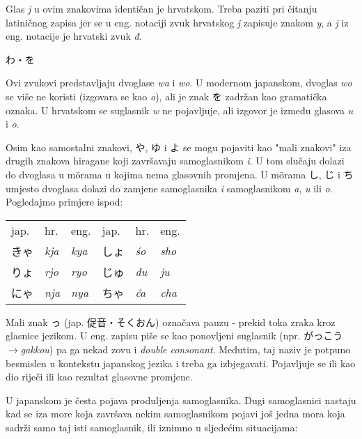 	Glas \textit{j} u ovim znakovima identičan je hrvatskom. Treba paziti pri čitanju latiničnog zapisa jer se u eng. notaciji zvuk hrvatskog \textit{j} zapisuje znakom \textit{y}, a \textit{j} iz eng. notacije je hrvatski zvuk \textit{đ}.
	
	\vspace{5pt}
	\noindent\ten わ・を
	
	Ovi zvukovi predstavljaju dvoglase \textit{wa} i \textit{wo}. U modernom japanskom, dvoglas \textit{wo} se više ne koristi (izgovara se kao \textit{o}), ali je znak を zadržan kao gramatička oznaka. U hrvatskom se suglasnik \textit{w} ne pojavljuje, ali izgovor je između glasova \textit{u} i \textit{o}.
	
	
	Osim kao samostalni znakovi, や, ゆ i よ se mogu pojaviti kao "mali znakovi" iza drugih znakova hiragane koji završavaju samoglasnikom \textit{i}. U tom slučaju dolazi do dvoglasa\footnotemark[3] u m\={o}rama u kojima nema glasovnih promjena. U m\={o}rama し, じ i ち umjesto dvoglasa dolazi do zamjene samoglasnika \textit{i} samoglasnikom \textit{a}, \textit{u} ili \textit{o}. Pogledajmo primjere ispod:
	
	\begin{tabular}{l l l | l l l}
		jap.&hr.&eng.&jap.&hr.&eng.\\
		きゃ&\textit{kja}&\textit{kya}&しょ&\textit{\'{s}o}&\textit{sho}\\
		りょ&\textit{rjo}&\textit{ryo}&じゅ&\textit{đu}&\textit{ju}\\
		にゃ&\textit{nja}&\textit{nya}&ちゃ&\textit{ća}&\textit{cha}\\
	\end{tabular}

	
	Mali znak っ (jap. 促音・そくおん) označava pauzu - prekid toka zraka kroz glasnice jezikom. U eng. zapisu piše se kao ponovljeni suglasnik (npr. がっこう$\rightarrow$\textit{gakkou}) pa ga nekad zovu i \textit{double consonant}. Međutim, taj naziv je potpuno besmislen u kontekstu japanskog jezika i treba ga izbjegavati. Pojavljuje se ili kao dio riječi ili kao rezultat glasovne promjene.
	
	
	U japanskom je česta pojava produljenja samoglasnika. Dugi samoglasnici nastaju kad se iza more koja završava nekim samoglasnikom pojavi još jedna mora koja sadrži samo taj isti samoglasnik, ili iznimno u sljedećim situacijama:
	
